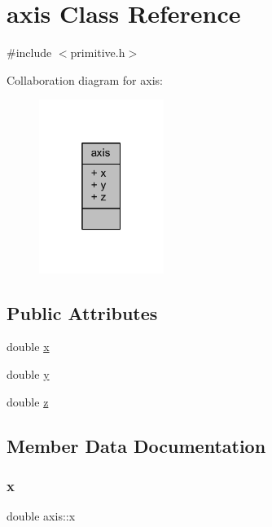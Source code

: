 \hypertarget{classaxis}{}\section{axis Class Reference}
\label{classaxis}


{\ttfamily \#include $<$primitive.\+h$>$}



Collaboration diagram for axis\+:
\nopagebreak
\begin{figure}[H]
\begin{center}
\leavevmode
\includegraphics[width=115pt]{classaxis__coll__graph}
\end{center}
\end{figure}
\subsection*{Public Attributes}
\begin{DoxyCompactItemize}
\item 
double \mbox{\hyperlink{classaxis_a3dbf8b803298595013fd5d6d639a930f}{x}}
\item 
double \mbox{\hyperlink{classaxis_ad2d7e25ee425fee3ee7e818839897ab9}{y}}
\item 
double \mbox{\hyperlink{classaxis_aacda2920117dea5bca43044c368805d6}{z}}
\end{DoxyCompactItemize}


\subsection{Member Data Documentation}
\mbox{\label{classaxis_a3dbf8b803298595013fd5d6d639a930f}} 
\subsubsection{\texorpdfstring{x}{x}}
{\footnotesize\ttfamily double axis\+::x}

